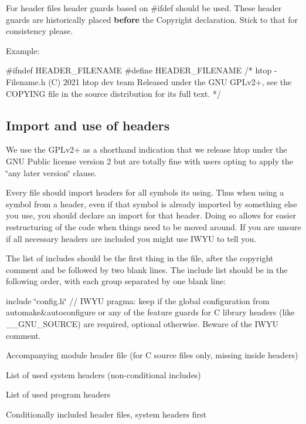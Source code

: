 For header files header guards based on {\ttfamily \#ifdef} should be used. These header guards are historically placed {\bfseries before} the Copyright declaration. Stick to that for consistency please.

Example\+:


\begin{DoxyCode}
\textcolor{preprocessor}{#ifndef HEADER\_FILENAME}
\textcolor{preprocessor}{#define HEADER\_FILENAME}
\textcolor{comment}{/*}
\textcolor{comment}{htop - Filename.h}
\textcolor{comment}{(C) 2021 htop dev team}
\textcolor{comment}{Released under the GNU GPLv2+, see the COPYING file}
\textcolor{comment}{in the source distribution for its full text.}
\textcolor{comment}{*/}
\end{DoxyCode}


\subsection*{Import and use of headers }

We use the G\+P\+Lv2+ as a shorthand indication that we release {\ttfamily htop} under the G\+NU Public license version 2 but are totally fine with users opting to apply the \char`\"{}any later version\char`\"{} clause.

Every file should import headers for all symbols it\textquotesingle{}s using. Thus when using a symbol from a header, even if that symbol is already imported by something else you use, you should declare an import for that header. Doing so allows for easier restructuring of the code when things need to be moved around. If you are unsure if all necessary headers are included you might use I\+W\+YU to tell you.

The list of includes should be the first thing in the file, after the copyright comment and be followed by two blank lines. The include list should be in the following order, with each group separated by one blank line\+:


\begin{DoxyEnumerate}
\item {\ttfamily include \char`\"{}config.\+h\char`\"{} // I\+W\+YU pragma\+: keep} if the global configuration from {\ttfamily automake}\&{\ttfamily autoconfigure} or any of the feature guards for C library headers (like {\ttfamily \+\_\+\+\_\+\+G\+N\+U\+\_\+\+S\+O\+U\+R\+CE}) are required, optional otherwise. Beware of the I\+W\+YU comment.
\item Accompanying module header file (for C source files only, missing inside headers)
\item List of used system headers (non-\/conditional includes)
\item List of used program headers
\item Conditionally included header files, system headers first
\end{DoxyEnumerate}


